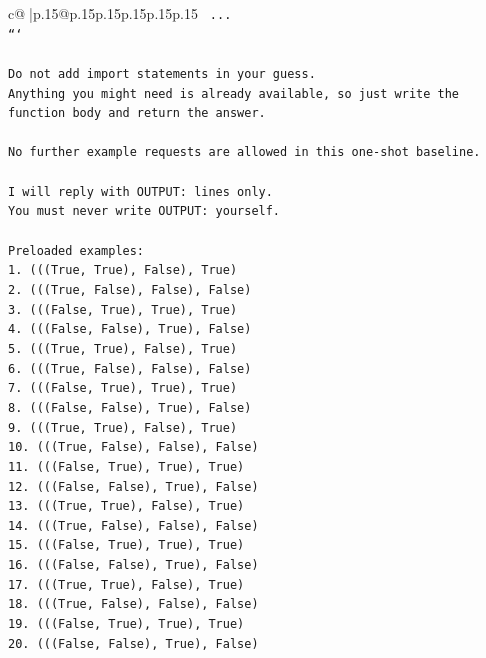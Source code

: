 \documentclass{article}
\begin{document}
{\begin{supertabular}{c@{$\;$}|p{.15\linewidth}@{}p{.15\linewidth}p{.15\linewidth}p{.15\linewidth}p{.15\linewidth}p{.15\linewidth}}
{{{\texttt{    ...} \\
\texttt{```} \\
\\ 
\texttt{Do not add import statements in your guess.} \\
\texttt{Anything you might need is already available, so just write the function body and return the answer.} \\
\\ 
\texttt{No further example requests are allowed in this one{-}shot baseline.} \\
\\ 
\texttt{I will reply with OUTPUT: lines only.} \\
\texttt{You must never write OUTPUT: yourself.} \\
\\ 
\texttt{Preloaded examples:} \\
\texttt{1. (((True, True), False), True)} \\
\texttt{2. (((True, False), False), False)} \\
\texttt{3. (((False, True), True), True)} \\
\texttt{4. (((False, False), True), False)} \\
\texttt{5. (((True, True), False), True)} \\
\texttt{6. (((True, False), False), False)} \\
\texttt{7. (((False, True), True), True)} \\
\texttt{8. (((False, False), True), False)} \\
\texttt{9. (((True, True), False), True)} \\
\texttt{10. (((True, False), False), False)} \\
\texttt{11. (((False, True), True), True)} \\
\texttt{12. (((False, False), True), False)} \\
\texttt{13. (((True, True), False), True)} \\
\texttt{14. (((True, False), False), False)} \\
\texttt{15. (((False, True), True), True)} \\
\texttt{16. (((False, False), True), False)} \\
\texttt{17. (((True, True), False), True)} \\
\texttt{18. (((True, False), False), False)} \\
\texttt{19. (((False, True), True), True)} \\
\texttt{20. (((False, False), True), False)} \\
}}}
\end{supertabular}}
\end{document}

